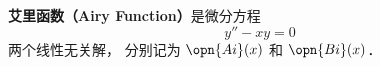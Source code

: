
\textbf{艾里函数（Airy Function）}是微分方程
\begin{equation}
y'' - xy = 0
\end{equation}
两个线性无关解， 分别记为 $\opn{Ai}(x)$ 和 $\opn{Bi}(x)$．
